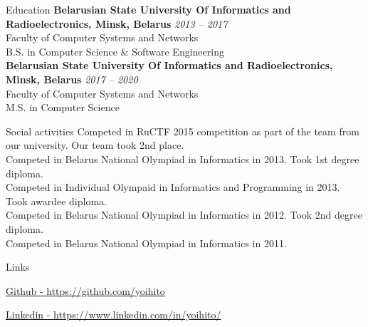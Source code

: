 \documentclass{resume}
\begin{document}
  \begin{rSection}{Education}
    {\bf Belarusian State University Of Informatics and Radioelectronics, Minsk, Belarus} \hfill {\em 2013 – 2017} \\ 
    { Faculty of Computer Systems and Networks } \\
    { B.S. in Computer Science \& Software Engineering } \\
    {\bf Belarusian State University Of Informatics and Radioelectronics, Minsk, Belarus} \hfill {\em 2017 – 2020} \\ 
    { Faculty of Computer Systems and Networks } \\
    { M.S. in Computer Science } \\
  \end{rSection}

  \begin{rSection}{Social activities}
  {Competed in RuCTF 2015 competition as part of the team from our university. Our team took 2nd place.} \\
  {Competed in Belarus National Olympiad in Informatics in 2013. Took 1st degree diploma.} \\
  {Competed in Individual Olympaid in Informatics and Programming in 2013. Took awardee diploma.} \\
  {Competed in Belarus National Olympiad in Informatics in 2012. Took 2nd degree diploma.} \\
  {Competed in Belarus National Olympiad in Informatics in 2011.}
  \end{rSection}

  \begin{rSection}{Links}
  \item \href{https://github.com/yoihito}{Github - https://github.com/yoihito}
  \item \href{https://www.linkedin.com/in/yoihito/}{Linkedin - https://www.linkedin.com/in/yoihito/}
  \end{rSection}    
\end{document}
